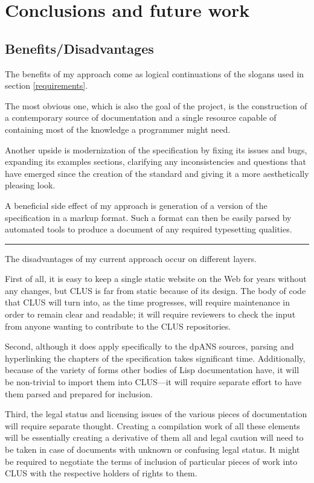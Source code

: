 \section{Conclusions and future work}

\subsection{Benefits/Disadvantages}

The benefits of my approach come as logical continuations of the slogans used in section \ref{requirements}.

The most obvious one, which is also the goal of the project, is the construction of a contemporary source of \cl{} documentation and a single resource capable of containing most of the knowledge a \cl{} programmer might need.

Another upside is modernization of the specification by fixing its issues and bugs, expanding its examples sections, clarifying any inconsistencies and questions that have emerged since the creation of the standard and giving it a more aesthetically pleasing look.

A beneficial side effect of my approach is generation of a version of the \cl{} specification in a markup format. Such a format can then be easily parsed by automated tools to produce a document of any required typesetting qualities.

\rule{\linewidth}{0.5pt}

The disadvantages of my current approach occur on different layers.

First of all, it is easy to keep a single static website on the Web for years without any changes, but CLUS is far from static because of its design. The body of code that CLUS will turn into, as the time progresses, will require maintenance in order to remain clear and readable; it will require reviewers to check the input from anyone wanting to contribute to the CLUS repositories.

Second, although it does apply specifically to the dpANS sources, parsing and hyperlinking the chapters of the specification takes significant time. Additionally, because of the variety of forms other bodies of Lisp documentation have, it will be non-trivial to import them into CLUS---it will require separate effort to have them parsed and prepared for inclusion.

Third, the legal status and licensing issues of the various pieces of documentation will require separate thought. Creating a compilation work of all these elements will be essentially creating a derivative of them all and legal caution will need to be taken in case of documents with unknown or confusing legal status. It might be required to negotiate the terms of inclusion of particular pieces of work into CLUS with the respective holders of rights to them.

